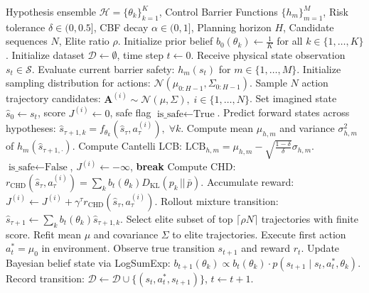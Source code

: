 \begin{algorithm}[t]
\caption{Safe-HEx-WM: Safety-Constrained Bayesian Experimental Design}
\label{alg:safe_hex_wm}
\begin{algorithmic}[1]
\REQUIRE Hypothesis ensemble $\mathcal{H} = \{\theta_k\}_{k=1}^K$, Control Barrier Functions $\{h_m\}_{m=1}^M$, Risk tolerance $\delta \in (0, 0.5]$, CBF decay $\alpha \in (0, 1]$, Planning horizon $H$, Candidate sequences $N$, Elite ratio $\rho$.
\STATE Initialize prior belief $b_0(\theta_k) \leftarrow \frac{1}{K}$ for all $k \in \{1, \dots, K\}$.
\STATE Initialize dataset $\mathcal{D} \leftarrow \emptyset$, time step $t \leftarrow 0$.
    \STATE Receive physical state observation $s_t \in \mathcal{S}$.
    \STATE Evaluate current barrier safety: $h_m(s_t)$ for $m \in \{1, \dots, M\}$.
    \STATE Initialize sampling distribution for actions: $\mathcal{N}(\mu_{0:H-1}, \Sigma_{0:H-1})$.
        \STATE Sample $N$ action trajectory candidates: $\mathbf{A}^{(i)} \sim \mathcal{N}(\mu, \Sigma), \; i \in \{1, \dots, N\}$.
            \STATE Set imagined state $\hat{s}_0 \leftarrow s_t$, score $J^{(i)} \leftarrow 0$, safe flag $\text{is\_safe} \leftarrow \text{True}$.
                \STATE Predict forward states across hypotheses: $\hat{s}_{\tau+1, k} = f_{\theta_k}(\hat{s}_\tau, a_\tau^{(i)}), \; \forall k$.
                \STATE Compute mean $\mu_{h, m}$ and variance $\sigma_{h, m}^2$ of $h_m(\hat{s}_{\tau+1, \cdot})$.
                \STATE Compute Cantelli LCB: $\text{LCB}_{h, m} = \mu_{h, m} - \sqrt{\frac{1-\delta}{\delta}} \sigma_{h, m}$.
                    \STATE $\text{is\_safe} \leftarrow \text{False}$, $J^{(i)} \leftarrow -\infty$, \textbf{break}
                \ENDIF
                \STATE Compute CHD: $r_{\text{CHD}}(\hat{s}_\tau, a_\tau^{(i)}) = \sum_k b_t(\theta_k) D_{\text{KL}}(p_k \,||\, \bar{p})$.
                \STATE Accumulate reward: $J^{(i)} \leftarrow J^{(i)} + \gamma^\tau r_{\text{CHD}}(\hat{s}_\tau, a_\tau^{(i)})$.
                \STATE Rollout mixture transition: $\hat{s}_{\tau+1} \leftarrow \sum_k b_t(\theta_k) \hat{s}_{\tau+1, k}$.
            \ENDFOR
        \ENDFOR
        \STATE Select elite subset of top $\lceil \rho N \rceil$ trajectories with finite score.
        \STATE Refit mean $\mu$ and covariance $\Sigma$ to elite trajectories.
    \ENDFOR
    \STATE Execute first action $a_t^* = \mu_0$ in environment.
    \STATE Observe true transition $s_{t+1}$ and reward $r_t$.
    \STATE Update Bayesian belief state via LogSumExp:
    \STATE $b_{t+1}(\theta_k) \propto b_t(\theta_k) \cdot p(s_{t+1} \mid s_t, a_t^*, \theta_k)$.
    \STATE Record transition: $\mathcal{D} \leftarrow \mathcal{D} \cup \{(s_t, a_t^*, s_{t+1})\}$, $t \leftarrow t + 1$.
\ENDWHILE
\end{algorithmic}
\end{algorithm}
